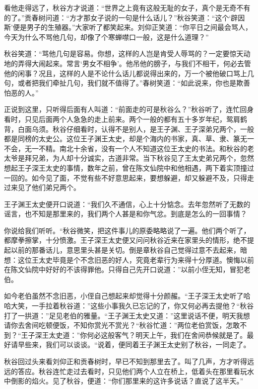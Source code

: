 \documentclass[12pt,UTF8]{ctexbook}
\begin{document}
{{{看他走得远了，秋谷方才说道：“世界之上竟有这般无耻的女子，真个是无奇不有的了。”贡春树问道：“方才那女子说的一句是什么话儿？”秋谷笑道：“这个‘辟因斯’便是男子的生殖器。”大家听了都笑起来。刘仰正笑道：“你平日之间最会骂人，今天为什么不骂他几句，却像了个寒蝉噤口一般，这是什么道理？”

秋谷笑道：“骂他几句是容易。你想，这样的人岂是肯受人辱骂的？一定要惊天动地的弄得大闹起来。常言‘男女不相争’。他吊他的膀子，与我们不相干，何必去管他的闲事？况且，这样的人是不论什么话儿都说得出来的，万一个被他破口骂上几句，或者把我们牵扯几句，我们就不值得了。”春树笑道：“如此说来，你也是欺善怕恶的人。”

正说到这里，只听得后面有人叫道：“前面走的可是秋谷么？”秋谷听了，连忙回身看时，只见后面两个人急急的走上前来。两个一般的都有五十多岁年纪，鸳肩鹤背，白面乌须。秋谷仔细看时，认得不是别人，是王子渊、王子深弟兄两个，一般都是同榜的太史公。这位王子渊王太史，却是个海内的书家，真、草、隶、篆无一不会，无一不精。南北十余省，没有一个人不知道这位王太史的书法。和秋谷的老太爷是拜兄弟，为人却十分诚实，古道非常。当下秋谷见了王太史弟兄两个，忽然想起王子深王太史的事情，数年之前，曾在陈文仙院中和他相遇，两下着实顶撞过一回的。如今见了面，不觉有些不好意思起来，要想躲避，却又躲避不及，只得走过来见了他们弟兄两个。

王子渊王太史便开口说道：“我们久不通信，心上十分惦念。去年忽然听了无数的谣言，也不知是那里来的，我们两个人甚是和你气忿。到底是怎么的一回事情？

你说给我们听听。“秋谷微笑，把这件事儿的原委略略说了一遍。他们两个听了，都摩拳擦掌，十分愤激。王子深王太史便又问问秋谷近来在家里头的情形，绝不提起以前的那番话儿，意思里头甚是关切。倒是章秋谷自己觉得过意不去起来，暗想：这位王太史毕竟是个不念旧恶的好人，究竟老辈行为来得十分厚道。懊悔以前在陈文仙院中好好的不该得罪他。只得自己先开口说道：”以前小侄无知，冒犯老伯。

如今老伯虽然不念旧恶，小侄自己想起来却觉得十分颜赧。“王子深王太史听了哈哈大笑，一手拉着秋谷道：”这些小事我久已忘记的了，你又何必再去提他？“秋谷打了一拱道：”足见老伯的雅量。“王子渊王太史又道：”这里说话不便，明天我想请你去舍间吃顿便饭，不知你赏光不赏光？“秋谷忙道：”两位老伯赏饭，怎敢不到？“王子深王太史道：”你何必这般客气？明天上午，我们在舍间恭候就是了。最好请早些来，我们可以谈谈。“说着，便同着王子渊王太史别了秋谷，一同走了。

秋谷回过头来看刘仰正和贡春树时，早已不知到那里去了。叫了几声，方才听得远远的答应。秋谷连忙走过去看时，只见他们两个人立在桥上，低着头在那里看玩水中倒影的焰火。见了秋谷，便道：“你们那里来的这许多说话？直说了这半天。”

}}}
\end{document}
